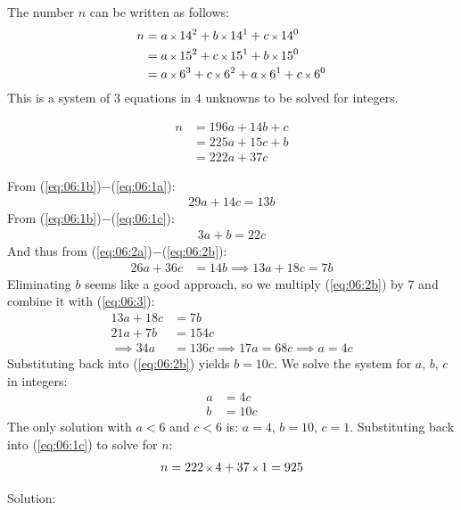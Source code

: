 The number $n$ can be written as follows:
\begin{align*}
n & = a \operatorname{\mbox{\scriptsize$\times$}} 14^{2} + b \operatorname{\mbox{\scriptsize$\times$}} 14^{1} + c \operatorname{\mbox{\scriptsize$\times$}} 14^{0}
\\
  & = a \operatorname{\mbox{\scriptsize$\times$}} 15^{2} + c \operatorname{\mbox{\scriptsize$\times$}} 15^{1} + b \operatorname{\mbox{\scriptsize$\times$}} 15^{0}
\\
  & = a \operatorname{\mbox{\scriptsize$\times$}} 6^{3} + c \operatorname{\mbox{\scriptsize$\times$}} 6^{2} + a \operatorname{\mbox{\scriptsize$\times$}} 6^{1} + c \operatorname{\mbox{\scriptsize$\times$}} 6^{0}
\end{align*}
This is a system of $3$ equations in $4$ unknowns to be solved for integers. 

\begin{align}
n & = 196a + 14b + c
\label{eq:06:1a}
\\
  & = 225a + 15c + b
\label{eq:06:1b}
\\
  & = 222a + 37c
\label{eq:06:1c}
\end{align}

From (\ref{eq:06:1b})$-$(\ref{eq:06:1a}):
\begin{align}
29a + 14c = 13b
\label{eq:06:2a}
\end{align}
From (\ref{eq:06:1b})$-$(\ref{eq:06:1c}):
\begin{align}
3a + b = 22c
\label{eq:06:2b}
\end{align}
And thus from (\ref{eq:06:2a})$-$(\ref{eq:06:2b}):
\begin{align}
26a + 36c
& = 14b
\implies 
13a + 18c = 7b
\label{eq:06:3}
\end{align}
Eliminating $b$ seems like a good approach, so we multiply (\ref{eq:06:2b}) by $7$ and combine it with (\ref{eq:06:3}):
\begin{align*}
13a + 18c 
& = 7b
\\
21a + 7b 
& = 154c
\\ 
\implies
34a & = 136c
\implies
17a = 68c
\implies
a = 4c
\end{align*}
Substituting back into (\ref{eq:06:2b}) yields $b=10c$. 
We solve the system for $a$, $b$, $c$ in integers:
\begin{align*}
a
& = 4c
\\
b
& = 10c
\end{align*}
The only solution with $a<6$ and $c<6$ is: $a=4$, $b=10$, $c=1$. Substituting back into (\ref{eq:06:1c}) to solve for $n$:
\begin{align*}
n = 222 \operatorname{\mbox{\scriptsize$\times$}} 4 + 37 \operatorname{\mbox{\scriptsize$\times$}} 1
  = 925
\end{align*}

Solution: 
